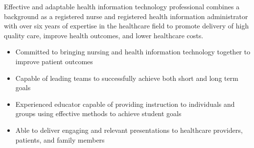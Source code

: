 

\begin{cvparagraph}

Effective and adaptable health information technology professional combines a background as a registered nurse and registered health information administrator with over six years of expertise in the healthcare field to promote delivery of high quality care, improve health outcomes, and lower healthcare costs.
    \begin{itemize}[topsep=0pt,itemsep=0pt,parsep=0pt,partopsep=0pt,leftmargin=4mm]
      \item Committed to bringing nursing and health information technology together to improve patient outcomes    
      \item Capable of leading teams to successfully achieve both short and long term goals
      \item Experienced educator capable of providing instruction to individuals and groups using effective methods to achieve student goals  
      \item Able to deliver engaging and relevant presentations to healthcare providers, patients, and family members
    \end{itemize}
\end{cvparagraph}
